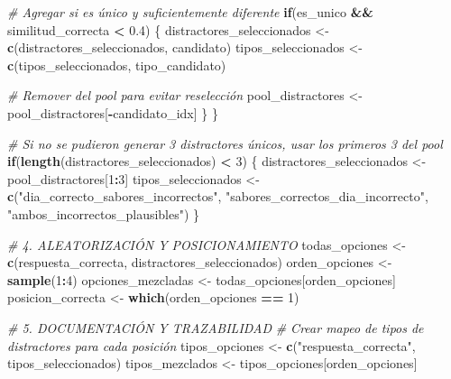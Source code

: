 \documentclass[
]{article}
\newenvironment{Shaded}{\begin{snugshade}}{\end{snugshade}}
\newcommand{\CommentTok}[1]{\textcolor[rgb]{0.56,0.35,0.01}{\textit{#1}}}
\newcommand{\ControlFlowTok}[1]{\textcolor[rgb]{0.13,0.29,0.53}{\textbf{#1}}}
\newcommand{\DecValTok}[1]{\textcolor[rgb]{0.00,0.00,0.81}{#1}}
\newcommand{\FloatTok}[1]{\textcolor[rgb]{0.00,0.00,0.81}{#1}}
\newcommand{\FunctionTok}[1]{\textcolor[rgb]{0.13,0.29,0.53}{\textbf{#1}}}
\newcommand{\NormalTok}[1]{#1}
\newcommand{\OtherTok}[1]{\textcolor[rgb]{0.56,0.35,0.01}{#1}}
\newcommand{\SpecialCharTok}[1]{\textcolor[rgb]{0.81,0.36,0.00}{\textbf{#1}}}
\newcommand{\StringTok}[1]{\textcolor[rgb]{0.31,0.60,0.02}{#1}}
\begin{document}
\begin{Shaded}
\begin{Highlighting}[]
    \CommentTok{\# Agregar si es único y suficientemente diferente}
    \ControlFlowTok{if}\NormalTok{(es\_unico }\SpecialCharTok{\&\&}\NormalTok{ similitud\_correcta }\SpecialCharTok{\textless{}} \FloatTok{0.4}\NormalTok{) \{}
\NormalTok{      distractores\_seleccionados }\OtherTok{\textless{}{-}} \FunctionTok{c}\NormalTok{(distractores\_seleccionados, candidato)}
\NormalTok{      tipos\_seleccionados }\OtherTok{\textless{}{-}} \FunctionTok{c}\NormalTok{(tipos\_seleccionados, tipo\_candidato)}

      \CommentTok{\# Remover del pool para evitar reselección}
\NormalTok{      pool\_distractores }\OtherTok{\textless{}{-}}\NormalTok{ pool\_distractores[}\SpecialCharTok{{-}}\NormalTok{candidato\_idx]}
\NormalTok{    \}}
\NormalTok{  \}}

  \CommentTok{\# Si no se pudieron generar 3 distractores únicos, usar los primeros 3 del pool}
  \ControlFlowTok{if}\NormalTok{(}\FunctionTok{length}\NormalTok{(distractores\_seleccionados) }\SpecialCharTok{\textless{}} \DecValTok{3}\NormalTok{) \{}
\NormalTok{    distractores\_seleccionados }\OtherTok{\textless{}{-}}\NormalTok{ pool\_distractores[}\DecValTok{1}\SpecialCharTok{:}\DecValTok{3}\NormalTok{]}
\NormalTok{    tipos\_seleccionados }\OtherTok{\textless{}{-}} \FunctionTok{c}\NormalTok{(}\StringTok{"dia\_correcto\_sabores\_incorrectos"}\NormalTok{,}
                           \StringTok{"sabores\_correctos\_dia\_incorrecto"}\NormalTok{,}
                           \StringTok{"ambos\_incorrectos\_plausibles"}\NormalTok{)}
\NormalTok{  \}}

  \CommentTok{\# 4. ALEATORIZACIÓN Y POSICIONAMIENTO}
\NormalTok{  todas\_opciones }\OtherTok{\textless{}{-}} \FunctionTok{c}\NormalTok{(respuesta\_correcta, distractores\_seleccionados)}
\NormalTok{  orden\_opciones }\OtherTok{\textless{}{-}} \FunctionTok{sample}\NormalTok{(}\DecValTok{1}\SpecialCharTok{:}\DecValTok{4}\NormalTok{)}
\NormalTok{  opciones\_mezcladas }\OtherTok{\textless{}{-}}\NormalTok{ todas\_opciones[orden\_opciones]}
\NormalTok{  posicion\_correcta }\OtherTok{\textless{}{-}} \FunctionTok{which}\NormalTok{(orden\_opciones }\SpecialCharTok{==} \DecValTok{1}\NormalTok{)}

  \CommentTok{\# 5. DOCUMENTACIÓN Y TRAZABILIDAD}
  \CommentTok{\# Crear mapeo de tipos de distractores para cada posición}
\NormalTok{  tipos\_opciones }\OtherTok{\textless{}{-}} \FunctionTok{c}\NormalTok{(}\StringTok{"respuesta\_correcta"}\NormalTok{, tipos\_seleccionados)}
\NormalTok{  tipos\_mezclados }\OtherTok{\textless{}{-}}\NormalTok{ tipos\_opciones[orden\_opciones]}
  

\end{Highlighting}
\end{Shaded}
\end{document}
